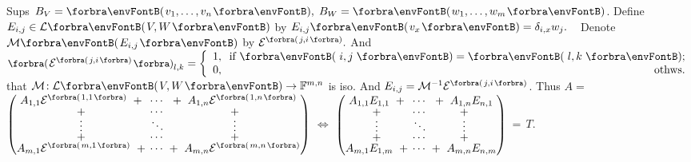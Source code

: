 \BulletPointX\NoteFor{[3.60]}\;\;Sups $B_V=\Par{v_1,\dots,v_n},\;B_W=\Par{w_1,\dots,w_m}$.\TextB{\vspace{2pt}}
{Define $E_{i,j}\in\Lm{V,W}$ by $E_{i,j}\Par{v_x}=\delta_{i,x} w_j.$} \quad\Corollary\,\,\, \TextB{}
{\Large Denote \envFontLarge$\Mt{E_{i,j}}$ by $\mathcal{E}^{\SmallPar[1pt]{j,i}}.$} And $\BigPar{\mathcal{E}^{\SmallPar[1pt]{j,i}}}_{l,k}=\MathLeftBrace{l}{1,\;\;\text{if }\Par[3pt]{i,j}=\Par[3pt]{l,k};\\0,\hfill\text{othws.}}$\TextB{\vspace{4pt}}
{\NOTICE that $\mathcal{M}\!:\Lm{V,W}\rightarrow\Fbb^{m,n}$ is iso. And $E_{i,j}=\Mneg\mathcal{E}^{\SmallPar[1pt]{j,i}}$.}\TextB{\vspace{4pt}}
Thus $A={}${\normalsize$\envFontSmall[\scriptsize]\begin{pmatrix}
A_{1,1}\mathcal{E}^{\Par{1,1}}\;\;+&\hspace{-6pt}
\cdots &\hspace{-6pt}+\;\;A_{1,n}\mathcal{E}^{\Par{1,n}}\\[-2pt]
+&\hspace{-6pt}\cdots &\hspace{-6pt}+\\[-4pt]
\vdots &\hspace{-6pt} \ddots &\hspace{-6pt} \vdots\\[-4pt]
+&\hspace{-6pt}\cdots &\hspace{-6pt}+\\[-2pt]
A_{m,1}\mathcal{E}^{\Par{m,1}}\;\;+&\hspace{-6pt}\cdots&\hspace{-6pt}+\;\;A_{m,n}\mathcal{E}^{\Par{m,n}}
\end{pmatrix} $}$\;\Longleftrightarrow\;${\FontSmall$\begin{pmatrix}
		A_{1,1}E_{1,1}\;\;+&\hspace{-6pt}\cdots &\hspace{-6pt}+\;\;A_{1,n}E_{n,1}\\[-2pt]
		+&\hspace{-6pt}\cdots &\hspace{-6pt} +\\[-4pt]
		\vdots &\hspace{-6pt} \ddots &\hspace{-6pt} \vdots\\[-4pt]
		+&\hspace{-6pt}\cdots &\hspace{-6pt} +\\[-2pt]
		A_{m,1}E_{1,m}\;\;+&\hspace{-6pt}\cdots &\hspace{-6pt}+\;\;A_{m,n}E_{n,m}
	\end{pmatrix}$}$\,=\,T$.\vspace{6pt}\TextB{}
